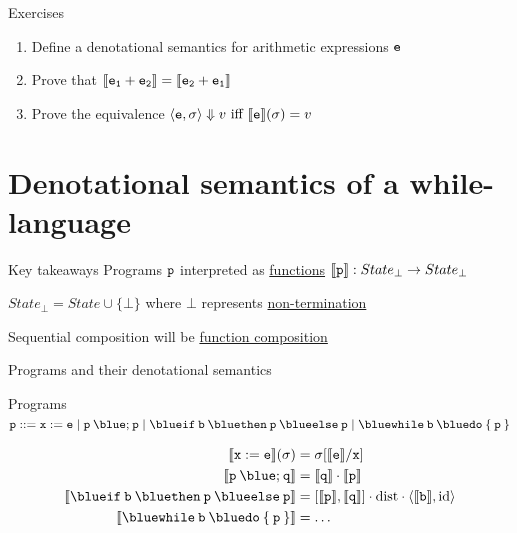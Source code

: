 \documentclass{beamer}
\begin{document}
\begin{frame}{Exercises}
        \begin{enumerate}
                \item Define a denotational semantics for arithmetic
                        expressions $\mathtt{e}$
                \item Prove that $\llbracket \mathtt{e_1} + \mathtt{e_2} \rrbracket =
                        \llbracket \mathtt{e_2} + \mathtt{e_1} \rrbracket$
                \item Prove the equivalence $\langle \mathtt{e}, \sigma \rangle \Downarrow v
                        \text{ iff } \llbracket \mathtt{e} \rrbracket(\sigma) = v$
        \end{enumerate}
\end{frame}

\section{Denotational semantics of a while-language}

\begin{frame}{Key takeaways}
        Programs $\mathtt{p}$ interpreted as \alert{\underline{functions}}
        $\llbracket \mathtt{p} \rrbracket : State_\bot \to State_\bot$

        $State_\bot = State \cup \{ \bot \}$ where $\bot$ represents
        \alert{\underline{non-termination}}

        Sequential composition will be \alert{\underline{function composition}}
\end{frame}

\begin{frame}{Programs and their denotational semantics}
	\begin{block}{Programs}
        $\prog{p} ::= \mathtt{x} := \mathtt{e} \mid
	\mathtt{p \> {\blue ;} \> p} \mid
	\mathtt{{\blue if} \> b \> {\blue then} \> p \> {\blue else} \> p} \mid
	\mathtt{{\blue while} \> b \> {\blue do} \> \{ \> p \> \}}$
	\end{block}

        \begin{align*}
                \sem{\prog{x : = e}}(\sigma) & = \sigma[\sem{\prog{e}}/\prog{x}] \\
                \sem{\prog{p} \> {\blue ;} \> \prog{q}} & 
                = \sem{\prog{q}} \comp \sem{\prog{p}} \\
                \sem{\mathtt{{\blue if} \> b \> {\blue then} \> p \> {\blue else} \> p}}
                                                        & 
                                                        = [\sem{\prog{p}},\sem{\prog{q}}] \comp
                                                        \mathrm{dist} \comp \pv{\sem{\prog{b}}}{\id}
                \\
                \sem{\mathtt{{\blue while} \> b \> {\blue do} \> \{ \> p \> \}} }
                                                        & =  \dots
        \end{align*}

        \pause
\end{frame}
\end{document}
